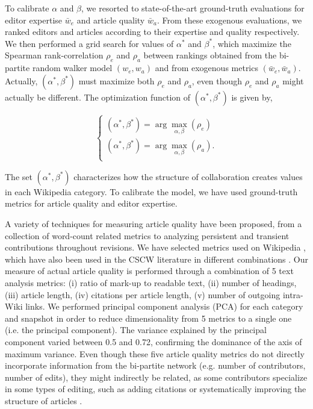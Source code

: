 To calibrate $\alpha$ and $\beta$, we resorted to state-of-the-art ground-truth evaluations for editor expertise $\bar{w}_e$ and article quality $\bar{w}_a$. From these exogenous evaluations, we ranked editors and articles according to their expertise and quality respectively. We then performed  a grid search for values of $\alpha^*$ and $\beta^*$, which maximize the Spearman rank-correlation $\rho_e$ and $\rho_a$ between rankings obtained from the bi-partite random walker model $(w_e,w_a)$ and from exogenous metrics $(\bar{w}_e,\bar{w}_a)$. Actually, $(\alpha^*,\beta^*)$ must maximize both $\rho_e$ and $\rho_a$, even though $\rho_e$ and $\rho_a$ might actually be different. The optimization function  of $(\alpha^*,\beta^*)$ is given by,

\newcommand{\argmax}{\arg\!\max}

\begin{equation}
\begin{cases}
(\alpha^*,\beta^*) = \argmax_{\alpha, \beta}(\rho_e)\\
(\alpha^*,\beta^*) =\argmax_{\alpha, \beta}(\rho_a).\\
\end{cases}
\end{equation}

The set $(\alpha^*,\beta^*)$ characterizes how the structure of collaboration creates values in each Wikipedia category. To calibrate the model, we have used ground-truth metrics for article quality and editor expertise. 

A variety of techniques for measuring article quality have been proposed, from a collection of word-count related metrics \cite{blumenstock2008sizematters} to analyzing persistent and transient contributions throughout revisions\cite{woehner2009}. We have selected metrics used on Wikipedia \cite{wang2013tell,klein}, which have also been used in the CSCW literature in different combinations \cite{kane2011} \cite{keegan2012}. Our measure of actual article quality is performed through a combination of 5 text analysis metrics: (i) ratio of mark-up to readable text, (ii) number of headings, (iii) article length, (iv) citations per article length, (v) number of outgoing intra-Wiki links. We performed principal component analysis (PCA) for each category and snapshot in order to reduce dimensionality from 5 metrics to a single one (i.e. the principal component). The variance explained by the principal component varied between 0.5 and 0.72, confirming the dominance of the axis of maximum variance. Even though these five article quality metrics do not directly incorporate information from the bi-partite network (e.g. number of contributors, number of edits), they might indirectly be related, as some contributors specialize in some types of editing, such as adding citations or systematically improving the structure of articles \cite{}.


